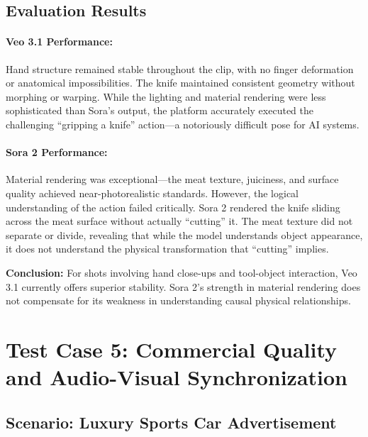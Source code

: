 \subsection{Evaluation Results}

\paragraph{Veo 3.1 Performance:}
Hand structure remained stable throughout the clip, with no finger deformation or anatomical impossibilities. The knife maintained consistent geometry without morphing or warping. While the lighting and material rendering were less sophisticated than Sora's output, the platform accurately executed the challenging ``gripping a knife'' action---a notoriously difficult pose for AI systems.

\paragraph{Sora 2 Performance:}
Material rendering was exceptional---the meat texture, juiciness, and surface quality achieved near-photorealistic standards. However, the logical understanding of the action failed critically. Sora 2 rendered the knife sliding across the meat surface without actually ``cutting'' it. The meat texture did not separate or divide, revealing that while the model understands object appearance, it does not understand the physical transformation that ``cutting'' implies.

\begin{resultbox}
\textbf{Conclusion:} For shots involving hand close-ups and tool-object interaction, Veo 3.1 currently offers superior stability. Sora 2's strength in material rendering does not compensate for its weakness in understanding causal physical relationships.
\end{resultbox}

\section{Test Case 5: Commercial Quality and Audio-Visual Synchronization}
\label{sec:test-case-5}

\subsection{Scenario: Luxury Sports Car Advertisement}

